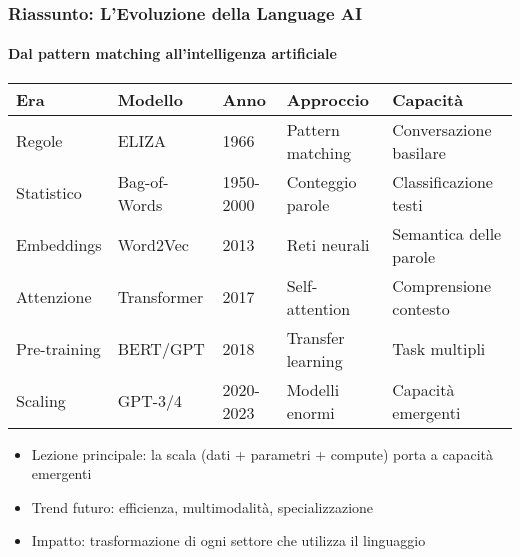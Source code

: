 \begin{frame}[t,fragile] \frametitle{Riassunto: L'Evoluzione della Language AI}
	{\scriptsize
		\framesubtitle{Dal pattern matching all'intelligenza artificiale}
		\begin{center}
		{\tiny
		\begin{table}
			\setlength{\tabcolsep}{4pt}
			\renewcommand{\arraystretch}{1.3}
			\centering
			\begin{tabular}{p{1.8cm}p{2.2cm}p{2cm}p{2.5cm}p{2cm}}
				\toprule
				\textbf{Era} & \textbf{Modello} & \textbf{Anno} & \textbf{Approccio} & \textbf{Capacità}\\
				\midrule
				\alert{Regole} & ELIZA & 1966 & Pattern matching & Conversazione basilare\\
				\alert{Statistico} & Bag-of-Words & 1950-2000 & Conteggio parole & Classificazione testi\\
				\alert{Embeddings} & Word2Vec & 2013 & Reti neurali & Semantica delle parole\\
				\alert{Attenzione} & Transformer & 2017 & Self-attention & Comprensione contesto\\
				\alert{Pre-training} & BERT/GPT & 2018 & Transfer learning & Task multipli\\
				\alert{Scaling} & GPT-3/4 & 2020-2023 & Modelli enormi & Capacità emergenti\\
				\bottomrule
			\end{tabular}
		\end{table}
		}
		\end{center}
		\vspace*{.3cm}
		\begin{itemize}[leftmargin=10pt,align=right]
			\item[\alert{\faHandORight}] \alert{Lezione principale:} la scala (dati + parametri + compute) porta a capacità emergenti
			\item[\alert{\faHandORight}] \alert{Trend futuro:} efficienza, multimodalità, specializzazione
			\item[\alert{\faHandORight}] \alert{Impatto:} trasformazione di ogni settore che utilizza il linguaggio
		\end{itemize}
	}
\end{frame}